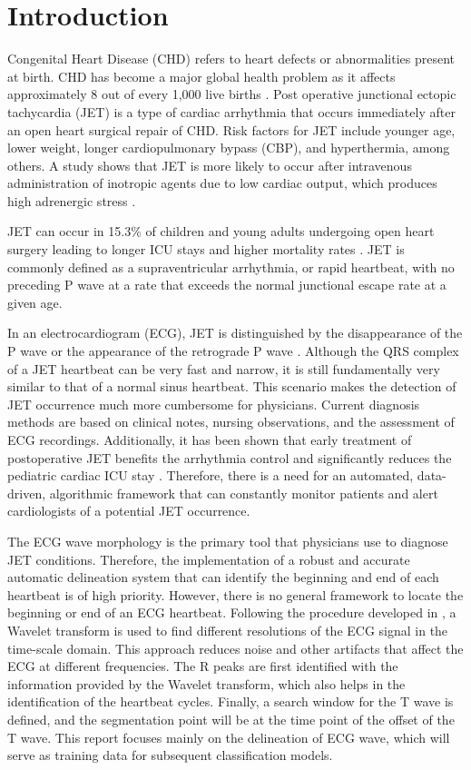 \documentclass[conference,compsoc]{IEEEtran}
\begin{document}
\section{Introduction}
Congenital Heart Disease (CHD) refers to heart defects or abnormalities present at birth. CHD has become a major global health problem as it affects approximately 8 out of every 1,000 live births \cite{vanderLindeDenise2011Bpoc}. Post operative junctional ectopic tachycardia (JET) is a type of cardiac arrhythmia that occurs immediately after an open heart surgical repair of CHD. Risk factors for JET include younger age, lower weight, longer cardiopulmonary bypass (CBP), and hyperthermia, among others. A study shows that JET is more likely to occur after intravenous administration of inotropic agents due to low cardiac output, which produces high adrenergic stress \cite{MOAKJEFFREYP.2013PJET}. 

JET can occur in 15.3\% of children and young adults undergoing open heart surgery leading to longer ICU stays and higher mortality rates \cite{MOAKJEFFREYP.2013PJET}. JET is commonly defined as a supraventricular arrhythmia, or rapid heartbeat, with no preceding P wave at a rate that exceeds the normal junctional escape rate at a given age. 


In an electrocardiogram (ECG), JET is distinguished by the disappearance of the P wave or the appearance of the retrograde P wave \cite{WaughJamieL.S.2022Anaj}. Although the QRS complex of a JET heartbeat can be very fast and narrow, it is still fundamentally very similar to that of a normal sinus heartbeat. This scenario makes the detection of JET occurrence much more cumbersome for physicians. Current diagnosis methods are based on clinical notes, nursing observations, and the assessment of ECG recordings. Additionally, it has been shown that early treatment of postoperative JET benefits the arrhythmia control and significantly reduces the pediatric cardiac ICU stay \cite{HaasNikolausA.MD2008Ioea}. Therefore, there is a need for an automated, data-driven, algorithmic framework that can constantly monitor patients and alert cardiologists of a potential JET occurrence.  

The ECG wave morphology is the primary tool that physicians use to diagnose JET conditions. Therefore, the implementation of a robust and accurate automatic delineation system that can identify the beginning and end of each heartbeat is of high priority. However, there is no general framework to locate the beginning or end of an ECG heartbeat. Following the procedure developed in \cite{1275572}, a Wavelet transform is used to find different resolutions of the ECG signal in the time-scale domain. This approach reduces noise and other artifacts that affect the ECG at different frequencies. The R peaks are first identified with the information provided by the Wavelet transform, which also helps in the identification of the heartbeat cycles. Finally, a search window for the T wave is defined, and the segmentation point will be at the time point of the offset of the T wave. This report focuses mainly on the delineation of ECG wave, which will serve as training data for subsequent classification models.
\end{document}

